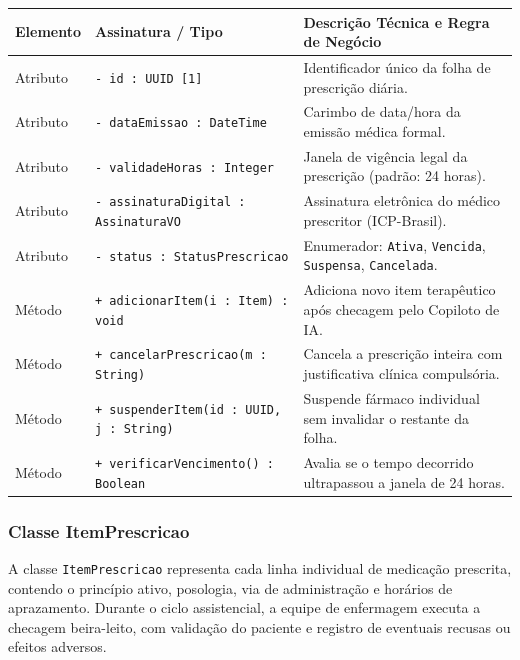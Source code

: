 \begingroup
\small
\noindent\begin{tabularx}{\linewidth}{l >{\raggedright\arraybackslash}p{5.7cm} >{\raggedright\arraybackslash}X}
\toprule
\textbf{Elemento} & \textbf{Assinatura / Tipo} & \textbf{Descrição Técnica e Regra de Negócio} \\
\midrule
Atributo & \texttt{- id : UUID [1]} & Identificador único da folha de prescrição diária. \\
Atributo & \texttt{- dataEmissao : DateTime} & Carimbo de data/hora da emissão médica formal. \\
Atributo & \texttt{- validadeHoras : Integer} & Janela de vigência legal da prescrição (padrão: 24 horas). \\
Atributo & \texttt{- assinaturaDigital : AssinaturaVO} & Assinatura eletrônica do médico prescritor (ICP-Brasil). \\
Atributo & \texttt{- status : StatusPrescricao} & Enumerador: \texttt{Ativa}, \texttt{Vencida}, \texttt{Suspensa}, \texttt{Cancelada}. \\
\midrule
Método & \texttt{+ adicionarItem(i : Item) : void} & Adiciona novo item terapêutico após checagem pelo Copiloto de IA. \\
Método & \texttt{+ cancelarPrescricao(m : String)} & Cancela a prescrição inteira com justificativa clínica compulsória. \\
Método & \texttt{+ suspenderItem(id : UUID, j : String)} & Suspende fármaco individual sem invalidar o restante da folha. \\
Método & \texttt{+ verificarVencimento() : Boolean} & Avalia se o tempo decorrido ultrapassou a janela de 24 horas. \\
\bottomrule
\end{tabularx}
\endgroup

\subsubsection{Classe ItemPrescricao}
A classe \texttt{ItemPrescricao} representa cada linha individual de medicação prescrita, contendo o princípio ativo, posologia, via de administração e horários de aprazamento. Durante o ciclo assistencial, a equipe de enfermagem executa a checagem beira-leito, com validação do paciente e registro de eventuais recusas ou efeitos adversos.


